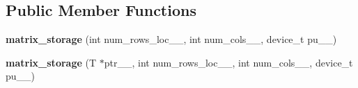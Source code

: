 \subsection*{Public Member Functions}
\begin{DoxyCompactItemize}
\item 
\hypertarget{classsddk_1_1matrix__storage_3_01_t_00_01matrix__storage__t_1_1slab_01_4_a0d4762b795865c1c3efd92c2fa5cc23a}{}{\bfseries matrix\+\_\+storage} (int num\+\_\+rows\+\_\+loc\+\_\+\+\_\+, int num\+\_\+cols\+\_\+\+\_\+, device\+\_\+t pu\+\_\+\+\_\+)\label{classsddk_1_1matrix__storage_3_01_t_00_01matrix__storage__t_1_1slab_01_4_a0d4762b795865c1c3efd92c2fa5cc23a}

\item 
\hypertarget{classsddk_1_1matrix__storage_3_01_t_00_01matrix__storage__t_1_1slab_01_4_a1a89b4b455ca9693c3aee8b098ed851d}{}{\bfseries matrix\+\_\+storage} (T $\ast$ptr\+\_\+\+\_\+, int num\+\_\+rows\+\_\+loc\+\_\+\+\_\+, int num\+\_\+cols\+\_\+\+\_\+, device\+\_\+t pu\+\_\+\+\_\+)\label{classsddk_1_1matrix__storage_3_01_t_00_01matrix__storage__t_1_1slab_01_4_a1a89b4b455ca9693c3aee8b098ed851d}


\end{DoxyCompactItemize}
